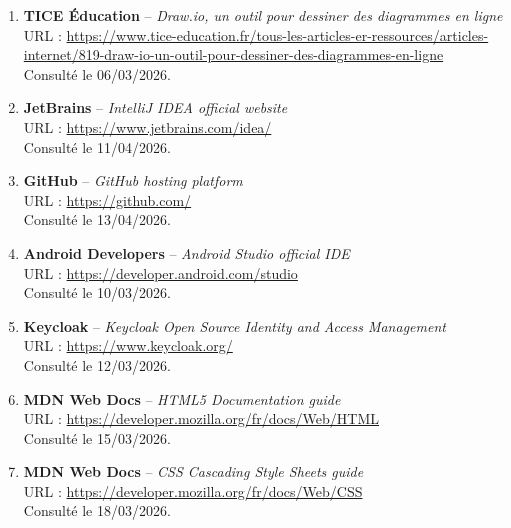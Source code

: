 \begin{enumerate}
    \item \textbf{TICE Éducation} -- \textit{Draw.io, un outil pour dessiner des diagrammes en ligne} \\
    URL : \href{https://www.tice-education.fr/tous-les-articles-er-ressources/articles-internet/819-draw-io-un-outil-pour-dessiner-des-diagrammes-en-ligne}{https://www.tice-education.fr/tous-les-articles-er-ressources/articles-internet/819-draw-io-un-outil-pour-dessiner-des-diagrammes-en-ligne} \\
    Consulté le 06/03/2026.
    
    \item \textbf{JetBrains} -- \textit{IntelliJ IDEA official website} \\
    URL : \href{https://www.jetbrains.com/idea/}{https://www.jetbrains.com/idea/} \\
    Consulté le 11/04/2026.
    
    \item \textbf{GitHub} -- \textit{GitHub hosting platform} \\
    URL : \href{https://github.com/}{https://github.com/} \\
    Consulté le 13/04/2026.
    
    \item \textbf{Android Developers} -- \textit{Android Studio official IDE} \\
    URL : \href{https://developer.android.com/studio}{https://developer.android.com/studio} \\
    Consulté le 10/03/2026.
    
    \item \textbf{Keycloak} -- \textit{Keycloak Open Source Identity and Access Management} \\
    URL : \href{https://www.keycloak.org/}{https://www.keycloak.org/} \\
    Consulté le 12/03/2026.
    
    \item \textbf{MDN Web Docs} -- \textit{HTML5 Documentation guide} \\
    URL : \href{https://developer.mozilla.org/fr/docs/Web/HTML}{https://developer.mozilla.org/fr/docs/Web/HTML} \\
    Consulté le 15/03/2026.
    
    \item \textbf{MDN Web Docs} -- \textit{CSS Cascading Style Sheets guide} \\
    URL : \href{https://developer.mozilla.org/fr/docs/Web/CSS}{https://developer.mozilla.org/fr/docs/Web/CSS} \\
    Consulté le 18/03/2026.
    

\end{enumerate}
